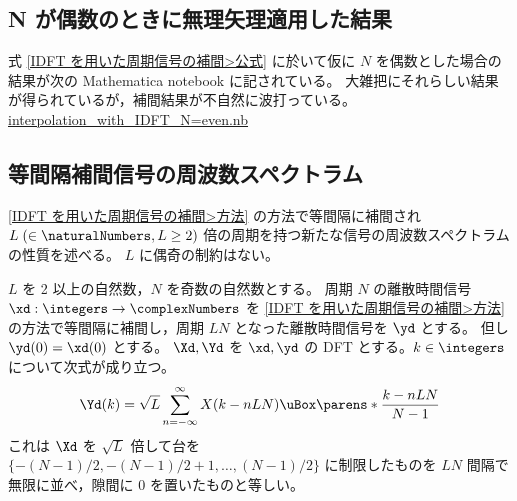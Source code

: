         \subsection{N が偶数のときに無理矢理適用した結果}
            \label{N が偶数のときに無理矢理適用した結果}
            式 \eqref{IDFT を用いた周期信号の補間>公式} に於いて仮に $N$ を偶数とした場合の結果が次の Mathematica notebook に記されている。
            大雑把にそれらしい結果が得られているが，補間結果が不自然に波打っている。\newline
            \href{\currfiledir/calc/Interpolation_with_IDFT/interpolation_with_IDFT_N=even/interpolation_with_IDFT_N=even.nb}{interpolation\_with\_IDFT\_N=even.nb}
        \subsection{等間隔補間信号の周波数スペクトラム}
            \ref{IDFT を用いた周期信号の補間>方法} の方法で等間隔に補間され $L\;(\in\naturalNumbers,L\geq 2)$ 倍の周期を持つ新たな信号の周波数スペクトラムの性質を述べる。
            $L$ に偶奇の制約はない。
            \begin{shadebox}
                $L$ を 2 以上の自然数，$N$ を奇数の自然数とする。
                周期 $N$ の離散時間信号 $\xd:\integers\to\complexNumbers$ を \ref{IDFT を用いた周期信号の補間>方法} の方法で等間隔に補間し，周期 $LN$ となった離散時間信号を $\yd$ とする。
                但し $\yd(0) = \xd(0)$ とする。
                $\Xd,\Yd$ を $\xd,\yd$ の DFT とする。$k\in\integers$ について次式が成り立つ。
                \[ \Yd(k) = \sqrt{L}\sum_{n=-\infty}^{\infty}X(k-nLN)\uBox\parens*{\frac{k-nLN}{N-1}} \]
                これは $\Xd$ を $\sqrt{L}$ 倍して台を $\{-(N-1)/2,-(N-1)/2+1,\dots,(N-1)/2\}$ に制限したものを $LN$ 間隔で無限に並べ，隙間に 0 を置いたものと等しい。
            \end{shadebox}
